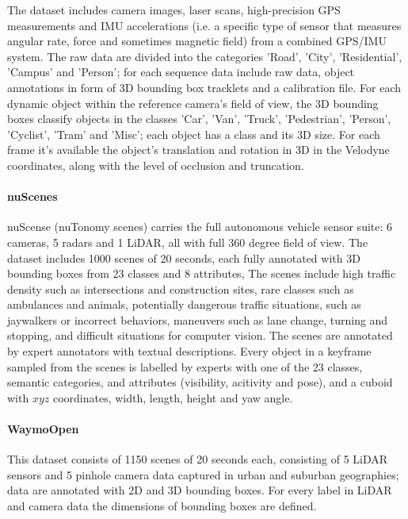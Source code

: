 The dataset includes camera images, laser scans, high-precision GPS measurements and IMU accelerations (i.e. a specific type of sensor that measures angular rate, force and sometimes magnetic field) from a combined GPS/IMU system. The raw data are divided into the categories 'Road', 'City', 'Residential', 'Campus' and 'Person'; for each sequence data include raw data, object annotations in form of 3D bounding box tracklets and a calibration file. For each dynamic object within the reference camera's field of view, the 3D bounding boxes classify objects in the classes 'Car', 'Van', 'Truck', 'Pedestrian', 'Person', 'Cyclist', 'Tram' and 'Misc'; each object has a class and its 3D size. For each frame it's available the object's translation and rotation in 3D in the Velodyne coordinates, along with the level of occlusion and truncation.

\paragraph{nuScenes~\cite{caesar2020nuscenes}}

nuScense (nuTonomy scenes) carries the full autonomous vehicle sensor suite: 6 cameras, 5 radars and 1 LiDAR, all with full 360 degree field of view. The dataset includes 1000 scenes of 20 seconds, each fully annotated with 3D bounding boxes from 23 classes and 8 attributes, The scenes include high traffic density such as intersections and construction sites, rare classes such as ambulances and animals, potentially dangerous traffic situations, such as jaywalkers or incorrect behaviors, maneuvers such as lane change, turning and stopping, and difficult situations for computer vision. The scenes are annotated by expert annotators with textual descriptions. Every object in a keyframe sampled from the scenes is labelled by experts with one of the 23 classes, semantic categories, and attributes (visibility, acitivity and pose), and a cuboid with $xyz$ coordinates, width, length, height and yaw angle.

\paragraph{WaymoOpen~\cite{sun2020scalability}}

This dataset consists of 1150 scenes of 20 seconds each, consisting of 5 LiDAR sensors and 5 pinhole camera data captured in urban and suburban geographies; data are annotated with 2D and 3D bounding boxes. For every label in LiDAR and camera data the dimensions of bounding boxes are defined.

